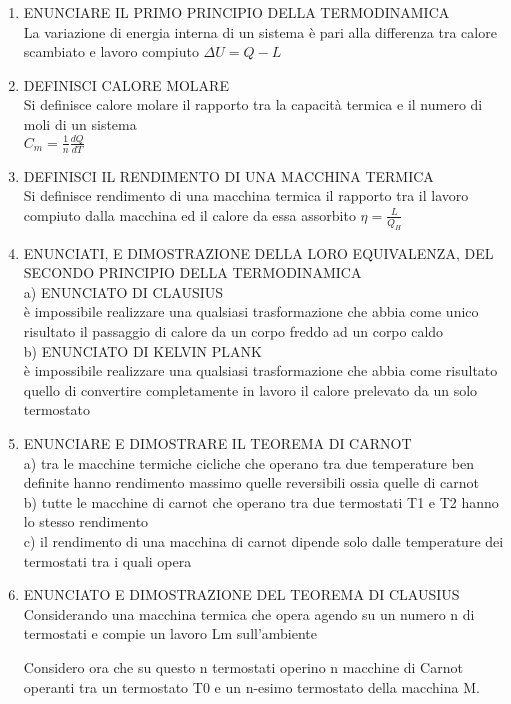 \documentclass[8pt]{scrreprt}
\begin{document}
\begin{multicols*}{2}
\begin{enumerate}
\item ENUNCIARE IL PRIMO PRINCIPIO DELLA TERMODINAMICA\\
La variazione di energia interna di un sistema è pari alla differenza tra calore scambiato e lavoro compiuto $\Delta U = Q - L$

\item DEFINISCI CALORE MOLARE\\
Si definisce calore molare il rapporto tra la capacità termica e il numero di moli di un sistema\\
$C_m = \frac{1}{n} \frac{dQ}{dT}$

\item DEFINISCI IL RENDIMENTO DI UNA MACCHINA TERMICA \\
Si definisce rendimento di una macchina termica il rapporto tra il lavoro compiuto dalla macchina ed il calore da essa assorbito $\eta = \frac{L}{Q_H}$

\item ENUNCIATI, E DIMOSTRAZIONE DELLA LORO EQUIVALENZA, DEL SECONDO PRINCIPIO DELLA TERMODINAMICA \\
a) ENUNCIATO DI CLAUSIUS\\
è impossibile realizzare una qualsiasi trasformazione che abbia come unico risultato il passaggio di calore da un corpo freddo ad un corpo caldo\\
b) ENUNCIATO DI KELVIN PLANK\\
è impossibile realizzare una qualsiasi trasformazione che abbia come risultato quello di convertire completamente in lavoro il calore prelevato da un solo termostato

\item ENUNCIARE E DIMOSTRARE IL TEOREMA DI CARNOT\\
a) tra le macchine termiche cicliche che operano tra due temperature ben definite hanno rendimento massimo quelle reversibili ossia quelle di carnot\\
b) tutte le macchine di carnot che operano tra due termostati T1 e T2 hanno lo stesso rendimento \\
c) il rendimento di una macchina di carnot dipende solo dalle temperature dei termostati tra i quali opera

\item ENUNCIATO E DIMOSTRAZIONE DEL TEOREMA DI CLAUSIUS\\
Considerando una macchina termica che opera agendo su un numero n di termostati e compie un lavoro Lm sull’ambiente

\vspace{10mm}
Considero ora che su questo n termostati operino n macchine di Carnot operanti tra un termostato T0 e un n-esimo termostato della macchina M.\\


\end{enumerate}
\end{multicols*}
\end{document}
